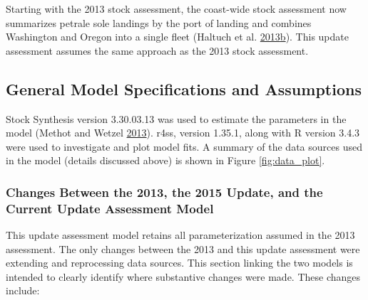\documentclass[12pt,]{article}
\begin{document}
Starting with the 2013 stock assessment, the coast-wide stock assessment
now summarizes petrale sole landings by the port of landing and combines
Washington and Oregon into a single fleet (Haltuch et al.
\protect\hyperlink{ref-haltuch_status_2013}{2013}\protect\hyperlink{ref-haltuch_status_2013}{b}).
This update assessment assumes the same approach as the 2013 stock
assessment.

\subsection{General Model Specifications and
Assumptions}\label{general-model-specifications-and-assumptions}

Stock Synthesis version 3.30.03.13 was used to estimate the parameters
in the model (Methot and Wetzel
\protect\hyperlink{ref-methot_stock_2013}{2013}). r4ss, version 1.35.1,
along with R version 3.4.3 were used to investigate and plot model fits.
A summary of the data sources used in the model (details discussed
above) is shown in Figure \ref{fig:data_plot}.

\subsubsection{Changes Between the 2013, the 2015 Update, and the
Current Update Assessment
Model}\label{changes-between-the-2013-the-2015-update-and-the-current-update-assessment-model}

This update assessment model retains all parameterization assumed in the
2013 assessment. The only changes between the 2013 and this update
assessment were extending and reprocessing data sources. This section
linking the two models is intended to clearly identify where substantive
changes were made. These changes include:
\end{document}
